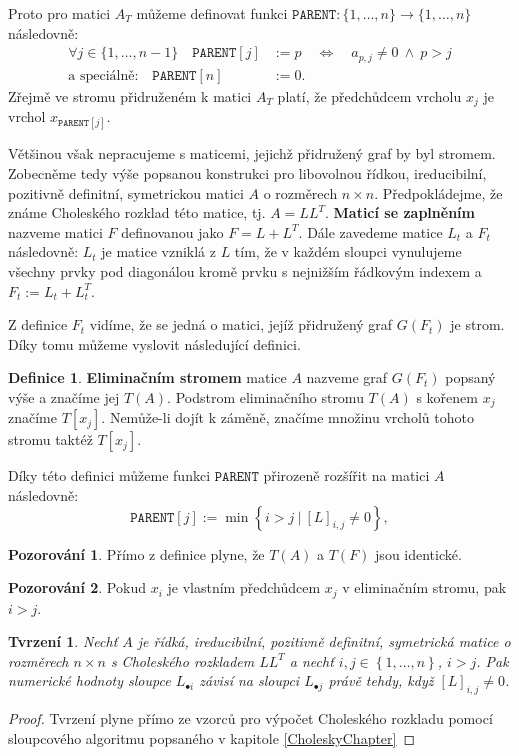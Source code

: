 \documentclass{ctuthesis}
\theoremstyle{plain}
\newtheorem{proposition}{Tvrzení}
\theoremstyle{definition}
\newtheorem{definition}{Definice}
\newtheorem{observation}{Pozorování}
\begin{document}
Proto pro matici $A_T$ můžeme definovat funkci $\texttt{PARENT}:\{1,\ldots,n\} \rightarrow \{1,\ldots,n\}$ následovně:
\begin{align*}
  \forall j \in \{1,\ldots,n-1\} \quad \texttt{PARENT}[j] & := p \quad \Leftrightarrow \quad a_{p,j} \neq 0 \ \wedge \ p > j \\
  \text{a speciálně:} \quad \texttt{PARENT}[n] & := 0.
\end{align*}
Zřejmě ve stromu přidruženém k matici $A_T$ platí, že předchůdcem vrcholu $x_j$ je vrchol $x_{\texttt{PARENT}[j]}$.

Většinou však nepracujeme s maticemi, jejichž přidružený graf by byl stromem. Zobecněme tedy výše popsanou konstrukci pro libovolnou řídkou, ireducibilní, pozitivně definitní, symetrickou matici $A$ o rozměrech $n \times n$. Předpokládejme, že známe Choleského rozklad této matice, tj. $A = LL^T$. \textbf{Maticí se zaplněním} nazveme matici $F$ definovanou jako $F = L + L^T$. Dále zavedeme matice $L_t$ a $F_t$ následovně: $L_t$ je matice vzniklá z $L$ tím, že v každém sloupci vynulujeme všechny prvky pod diagonálou kromě prvku s nejnižším řádkovým indexem a $F_t := L_t + L_t^T$.

Z definice $F_t$ vidíme, že se jedná o matici, jejíž přidružený graf $G(F_t)$ je strom. Díky tomu můžeme vyslovit následující definici.

\begin{definition}
    \textbf{Eliminačním stromem} matice $A$ nazveme graf $G(F_t)$ popsaný výše a značíme jej $T(A)$.
    Podstrom eliminačního stromu $T(A)$ s kořenem $x_j$ značíme $T[x_j]$. Nemůže-li dojít k záměně, značíme množinu vrcholů tohoto stromu taktéž $T[x_j]$.
\end{definition}

Díky této definici můžeme funkci $\texttt{PARENT}$ přirozeně rozšířit na matici $A$ následovně:
\[
    \texttt{PARENT}[j] := \min \left\{ i > j \ | \ [L]_{i,j} \neq 0\right\},
\]

\begin{observation}
Přímo z definice plyne, že $T(A)$ a $T(F)$ jsou identické.
\end{observation}

\begin{observation}
Pokud $x_i$ je vlastním předchůdcem $x_j$ v eliminačním stromu, pak $i > j$.
\end{observation}

\begin{proposition}
  \label{ColDepProposition}
  Nechť $A$ je řídká, ireducibilní, pozitivně definitní, symetrická matice o rozměrech $n \times n$ s Choleského rozkladem $LL^T$ a nechť $i,j \in \left\{1,\ldots,n \right\}$, $i > j$. Pak numerické hodnoty sloupce $L_{\bullet i}$ závisí na sloupci $L_{\bullet j}$ právě tehdy,
  když $[L]_{i,j} \neq 0$.
\end{proposition}
\begin{proof}
  Tvrzení plyne přímo ze vzorců pro výpočet Choleského rozkladu pomocí sloupcového algoritmu popsaného v kapitole \ref{CholeskyChapter}
\end{proof}
\end{document}

